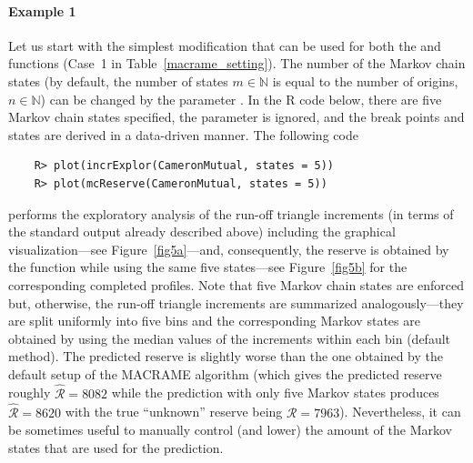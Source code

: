 \vspace{-10pt}\paragraph{Example 1} Let us start with the simplest  modification that can be used for both the  and  functions (Case~1 in Table~\ref{macrame_setting}). The number of the Markov chain states (by default, the number of states $m \in \mathbb{N}$ is equal to the number of origins, $n \in \mathbb{N}$) can be changed by the parameter . In the R code below, there are five Markov chain states specified,  the parameter  is ignored, and the break points and states are derived in a data-driven manner. The following code 
\begin{verbatim}
    R> plot(incrExplor(CameronMutual, states = 5))
    R> plot(mcReserve(CameronMutual, states = 5))
\end{verbatim}
 performs the exploratory analysis of the run-off triangle increments (in terms of the standard output already described above) including the graphical visualization---see Figure~\ref{fig5a}---and, consequently, the reserve is obtained by the  function while using the same five states---see Figure~\ref{fig5b} for the corresponding completed profiles. Note that five Markov chain states are enforced but, otherwise, the run-off triangle increments are summarized analogously---they are split uniformly into five bins and the corresponding Markov  states are obtained by using the median values of the increments within each bin (default method). The predicted reserve is slightly worse than the one obtained by the default setup of the MACRAME algorithm (which gives the predicted reserve roughly $\widehat{\mathcal{R}} = 8082$ while the prediction with only five Markov states produces $\widehat{\mathcal{R}} = 8620$ with the true ``unknown'' reserve being $\mathcal{R} = 7963$). Nevertheless, it can be sometimes useful to manually control (and lower) the amount of the Markov states that are used for the prediction. 

